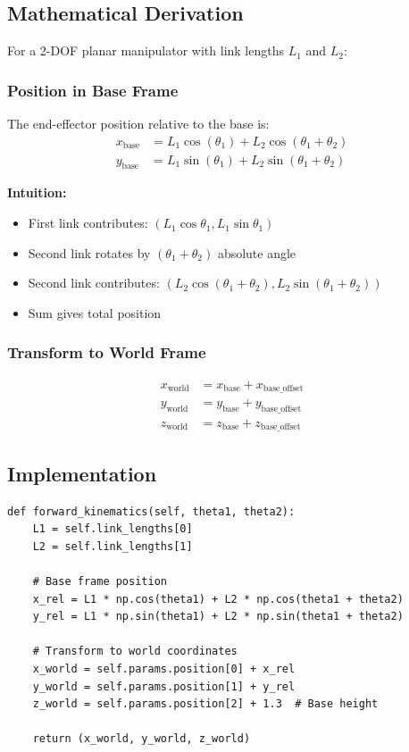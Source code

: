 \documentclass[11pt,a4paper]{article}
\begin{document}
\subsection{Mathematical Derivation}

For a 2-DOF planar manipulator with link lengths $L_1$ and $L_2$:

\subsubsection{Position in Base Frame}

The end-effector position relative to the base is:
\begin{align}
x_{\text{base}} &= L_1 \cos(\theta_1) + L_2 \cos(\theta_1 + \theta_2) \\
y_{\text{base}} &= L_1 \sin(\theta_1) + L_2 \sin(\theta_1 + \theta_2)
\end{align}

\textbf{Intuition:}
\begin{itemize}
    \item First link contributes: $(L_1 \cos\theta_1, L_1 \sin\theta_1)$
    \item Second link rotates by $(\theta_1 + \theta_2)$ absolute angle
    \item Second link contributes: $(L_2 \cos(\theta_1+\theta_2), L_2 \sin(\theta_1+\theta_2))$
    \item Sum gives total position
\end{itemize}

\subsubsection{Transform to World Frame}

\begin{align}
x_{\text{world}} &= x_{\text{base}} + x_{\text{base\_offset}} \\
y_{\text{world}} &= y_{\text{base}} + y_{\text{base\_offset}} \\
z_{\text{world}} &= z_{\text{base}} + z_{\text{base\_offset}}
\end{align}

\subsection{Implementation}

\begin{lstlisting}
def forward_kinematics(self, theta1, theta2):
    L1 = self.link_lengths[0]
    L2 = self.link_lengths[1]
    
    # Base frame position
    x_rel = L1 * np.cos(theta1) + L2 * np.cos(theta1 + theta2)
    y_rel = L1 * np.sin(theta1) + L2 * np.sin(theta1 + theta2)
    
    # Transform to world coordinates
    x_world = self.params.position[0] + x_rel
    y_world = self.params.position[1] + y_rel
    z_world = self.params.position[2] + 1.3  # Base height
    
    return (x_world, y_world, z_world)
\end{lstlisting}
\end{document}

